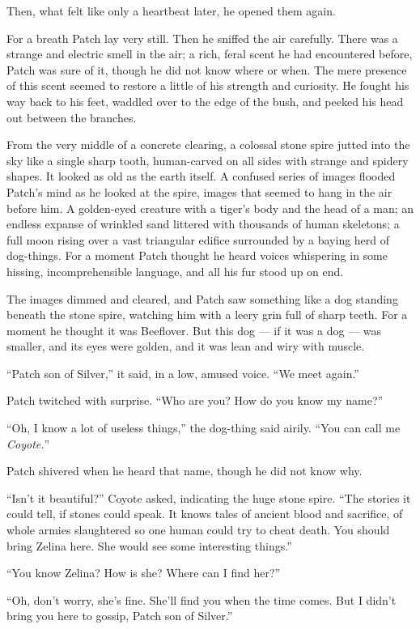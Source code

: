 \documentclass[12pt]{memoir}
\begin{document}
Then, what felt like only a heartbeat later, he opened them again.

For a breath Patch lay very still. Then he sniffed the air
carefully. There was a strange and electric smell in the air; a rich,
feral scent he had encountered before, Patch was sure of it, though he
did not know where or when. The mere presence of this scent seemed to
restore a little of his strength and curiosity. He fought his way back
to his feet, waddled over to the edge of the bush, and peeked his head
out between the branches.

From the very middle of a concrete clearing, a colossal stone spire
jutted into the sky like a single sharp tooth, human-carved on all
sides with strange and spidery shapes. It looked as old as the earth
itself. A confused series of images flooded Patch’s mind as he looked
at the spire, images that seemed to hang in the air before him. A
golden-eyed creature with a tiger’s body and the head of a man; an
endless expanse of wrinkled sand littered with thousands of human
skeletons; a full moon rising over a vast triangular edifice
surrounded by a baying herd of dog-things. For a moment Patch thought
he heard voices whispering in some hissing, incomprehensible language,
and all his fur stood up on end.

The images dimmed and cleared, and Patch saw something like a dog
standing beneath the stone spire, watching him with a leery grin full
of sharp teeth. For a moment he thought it was Beeflover. But this dog
— if it was a dog — was smaller, and its eyes were golden, and it was
lean and wiry with muscle.

“Patch son of Silver,” it said, in a low, amused voice. “We meet
again.”

Patch twitched with surprise. “Who are you? How do you know my name?”

“Oh, I know a lot of useless things,” the dog-thing said airily. “You
can call me \textit{Coyote.}”

Patch shivered when he heard that name, though he did not know why.

“Isn’t it beautiful?” Coyote asked, indicating the huge stone
spire. “The stories it could tell, if stones could speak. It knows
tales of ancient blood and sacrifice, of whole armies slaughtered so
one human could try to cheat death. You should bring Zelina here. She
would see some interesting things.”

“You know Zelina? How is she? Where can I find her?”

“Oh, don’t worry, she’s fine. She’ll find you when the time comes. But
I didn’t bring you here to gossip, Patch son of Silver.”
\end{document}
